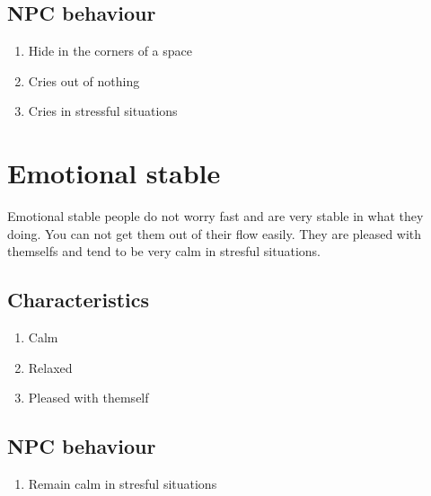 \documentclass{article}
\begin{document}
\subsection{NPC behaviour}
\begin{enumerate}
\item Hide in the corners of a space
\item Cries out of nothing
\item Cries in stressful situations
\end{enumerate} 

\section{Emotional stable}

Emotional stable people do not worry fast and are very stable in what they doing. You can not get
them out of their flow easily. They are pleased with themselfs and tend to be very calm in stresful
situations. \cite{bigfive}

\subsection{Characteristics}
\begin{enumerate}
\item Calm
\item Relaxed
\item Pleased with themself
\end{enumerate} 

\subsection{NPC behaviour}
\begin{enumerate}
\item Remain calm in stresful situations
\end{enumerate} 

\newpage


\end{document}
